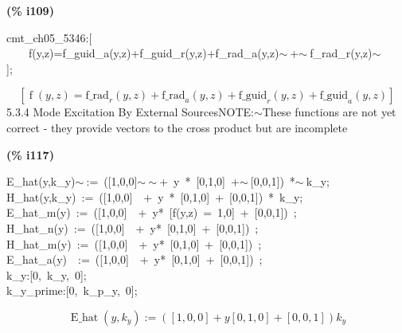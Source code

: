 \documentclass[fleqn]{article}
\begin{document}
\noindent
\begin{minipage}[t]{4.000000em}\color{red}\bfseries
(\% i109)	
\end{minipage}
\begin{minipage}[t]{\textwidth}\color{blue}
cmt\_ch05\_5346:[\\
\ \ \ \ f(y,z)=f\_guid\_a(y,z)+f\_guid\_r(y,z)+f\_rad\_a(y,z)\ensuremath{\sim\ }+\ensuremath{\sim\ }f\_rad\_r(y,z)\ensuremath{\sim\ }\\
];
\end{minipage}
\[\displaystyle \tag{\% o109} 
\left[ \operatorname{f}\left( y\operatorname{,}z\right) ={{\ensuremath{\mathrm{f\_ rad}}}_r}\left( y\operatorname{,}z\right) +{{\ensuremath{\mathrm{f\_ rad}}}_a}\left( y\operatorname{,}z\right) +{{\ensuremath{\mathrm{f\_ guid}}}_r}\left( y\operatorname{,}z\right) +{{\ensuremath{\mathrm{f\_ guid}}}_a}\left( y\operatorname{,}z\right) \right] \mbox{}
\]
5.3.4   Mode Excitation By External SourcesNOTE:\ensuremath{\sim }These functions are not yet correct - they provide vectors to the cross product but are incomplete


\noindent
\begin{minipage}[t]{4.000000em}\color{red}\bfseries
(\% i117)	
\end{minipage}
\begin{minipage}[t]{\textwidth}\color{blue}
E\_hat(y,k\_y)\ensuremath{\sim\ }:=\ ([1,0,0]\ensuremath{\sim\ }\ensuremath{\sim\ }+\ y\ *\ [0,1,0]\ +\ensuremath{\sim\ }[0,0,1])\ *\ensuremath{\sim\ }k\_y;\\
H\_hat(y,k\_y)\ :=\ ([1,0,0]\ \ +\ y\ *\ [0,1,0]\ +\ [0,0,1])\ *\ k\_y;\\
E\_hat\_m(y)\ :=\ ([1,0,0]\ \ +\ y*\ [f(y,z)\ =\ 1,0]\ +\ [0,0,1])\ ;\\
H\_hat\_n(y)\ :=\ ([1,0,0]\ \ +\ y*\ [0,1,0]\ +\ [0,0,1])\ ;\\
H\_hat\_m(y)\ :=\ ([1,0,0]\ \ +\ y*\ [0,1,0]\ +\ [0,0,1])\ ;\\
E\_hat\_a(y)\ \ :=\ ([1,0,0]\ \ +\ y*\ [0,1,0]\ +\ [0,0,1])\ ;\\
k\_y:[0,\ k\_y,\ 0];\\
k\_y\_prime:[0,\ k\_p\_y,\ 0];
\end{minipage}
\[\displaystyle \tag{\% o110} 
\operatorname{E\_ hat}\left( y\operatorname{,}{k_y}\right) \operatorname{:=}\left( \left[ 1\operatorname{,}0\operatorname{,}0\right] +y \left[ 0\operatorname{,}1\operatorname{,}0\right] +\left[ 0\operatorname{,}0\operatorname{,}1\right] \right)  {k_y}\mbox{}\]
\end{document}
